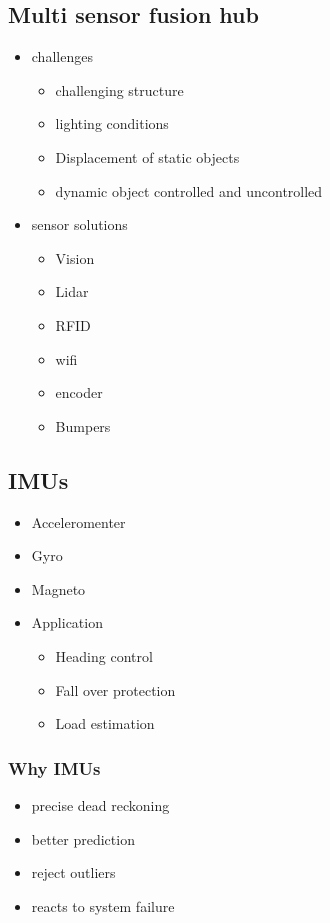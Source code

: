 \documentclass[a4paper]{article}
\begin{document}
\subsection{Multi sensor fusion hub}
\begin{itemize}
	\item challenges
	      \begin{itemize}
		      \item challenging structure
		      \item lighting conditions
		      \item Displacement of static objects
		      \item dynamic object controlled and uncontrolled
	      \end{itemize}
	\item sensor solutions
	      \begin{itemize}
		      \item Vision
		      \item Lidar
		      \item RFID
		      \item wifi
		      \item encoder
		      \item Bumpers
	      \end{itemize}
\end{itemize}
\subsection{IMUs}
\begin{itemize}
	\item Acceleromenter
	\item Gyro
	\item Magneto
	\item Application
	      \begin{itemize}
		      \item Heading control
		      \item Fall over protection
		      \item Load estimation
	      \end{itemize}
\end{itemize}
\subsubsection{Why IMUs}
\begin{itemize}
	\item precise dead reckoning
	\item better prediction
	\item reject outliers
	\item reacts to system failure
\end{itemize}
\newpage
\end{document}
